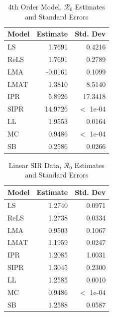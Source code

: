 \documentclass[12pt]{article}
\newcommand{\rr}{\ensuremath{\mathcal{R}_0}}
\begin{document}
\begin{table}[H]
	
	
	\centering
	\begin{tabular}[t]{l|r|r}
		\hline
		Model & Estimate & Std. Dev\\
		\hline
		LS & 1.7691 & 0.4216\\
		\hline
		ReLS & 1.7691 & 0.2789\\
		\hline
		LMA & -0.0161 & 0.1099\\
		\hline
		LMAT & 1.3810 & 8.5140\\
		\hline
		IPR & 5.8926 & 17.3418\\
		\hline
		SIPR & 14.9726 & $<$ 1e-04\\
		\hline
		LL & 1.9553 & 0.0164\\
		\hline
		MC & 0.9486 & $<$ 1e-04\\
		\hline
		SB & 0.2586 & 0.0266\\
		\hline
	\end{tabular}
	\caption{4th Order Model, $\rr$ Estimates and Standard Errors}
\end{table}


\begin{table}[H]
	
	\centering
	\begin{tabular}[t]{l|r|r}
		\hline
		Model & Estimate & Std. Dev\\
		\hline
		LS & 1.2740 & 0.0971\\
		\hline
		ReLS & 1.2738 & 0.0334\\
		\hline
		LMA & 0.9503 & 0.1067\\
		\hline
		LMAT & 1.1959 & 0.0247\\
		\hline
		IPR & 1.2085 & 1.0031\\
		\hline
		SIPR & 1.3045 & 0.2300\\
		\hline
		LL & 1.2585 & 0.0010\\
		\hline
		MC & 0.9486 & $<$ 1e-04\\
		\hline
		SB & 1.2588 & 0.0587\\
		\hline
	\end{tabular}
	\caption{Linear SIR Data, $\rr$ Estimates and Standard Errors}
\end{table}
\end{document}
